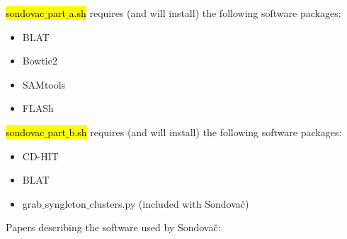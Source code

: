 \documentclass[a4paper, 11pt, twoside]{article}
\renewcommand{\texttt}[1]{\hl{\ttfamily #1}}
\begin{document}
\texttt{sondovac$\_$part$\_$a.sh} requires (and will install) the following software packages:

\begin{itemize}
  \item BLAT
  \item Bowtie2
  \item SAMtools
  \item FLASh
\end{itemize}

\texttt{sondovac$\_$part$\_$b.sh} requires (and will install) the following software packages:

\begin{itemize}
  \item CD-HIT
  \item BLAT
  \item grab$\_$syngleton$\_$clusters.py (included with Sondovač)
\end{itemize}

Papers describing the software used by Sondovač:
\end{document}
